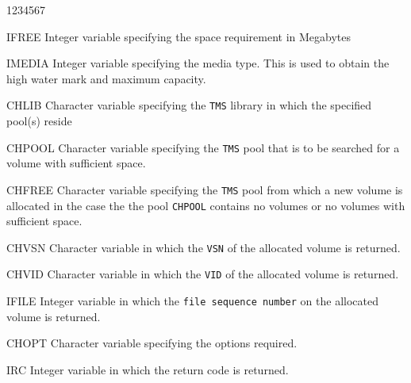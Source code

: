 \begin{DLtt}{1234567}
\item[IFREE]
Integer variable specifying the space requirement in Megabytes
\item[IMEDIA]Integer variable specifying the media type. This
is used to obtain the high water mark and maximum capacity.
\item[CHLIB]Character variable specifying the {\tt TMS} library
in which the specified pool(s) reside
\item[CHPOOL]Character variable specifying the {\tt TMS}
pool that is to be searched for a volume with sufficient
space. 
\item[CHFREE]Character variable specifying the {\tt TMS}
pool from which a new volume is allocated in the case
the the pool {\tt CHPOOL} contains no volumes or no volumes
with sufficient space.
\item[CHVSN]Character variable in which the {\tt VSN} of the
allocated volume is returned.
\item[CHVID]Character variable in which the {\tt VID} of the
allocated volume is returned.
\item[IFILE]Integer variable in which the {\tt file sequence number}
on the allocated volume is returned.
\item[CHOPT]
Character variable specifying the options required.
\item[IRC]
Integer variable in which the return code is returned.
\end{DLtt}

